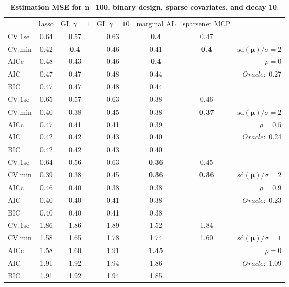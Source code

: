 \begin{table}\vspace{-.5cm}
\caption[l]{ { \bf Estimation MSE for n=100, binary design, 
sparse covariates, and  decay  10}.}
\vspace{-.5cm}
\footnotesize{}
\begin{center}
\begin{tabular}{l*{5}{c}|r}
& lasso & GL $\gamma=1$ & GL $\gamma=10$ & marginal AL & sparsenet MCP  & \\
 \cline{1-7}
CV.1se & 0.64 & 0.57 & 0.63 & {\bf 0.4} & 0.47 & \\
CV.min & 0.42 & {\bf 0.4} & 0.46 & 0.41 & {\bf 0.4} &  $\mathrm{sd}(\mathbf{\mu})/\sigma=2$ \\
AICc & 0.48 & 0.43 & 0.46 & {\bf 0.4} & & $\rho=0$ \\
AIC & 0.47 & 0.47 & 0.48 & 0.44 & &  \multirow{2}{*}{$Oracle: $ 0.27} \\
BIC & 0.47 & 0.47 & 0.48 & 0.44 & &  \\
 \hline 
CV.1se & 0.65 & 0.57 & 0.63 & 0.38 & 0.46 & \\
CV.min & 0.40 & 0.38 & 0.45 & 0.38 & {\bf 0.37} &  $\mathrm{sd}(\mathbf{\mu})/\sigma=2$ \\
AICc & 0.47 & 0.41 & 0.41 & 0.39 & & $\rho=0.5$ \\
AIC & 0.42 & 0.42 & 0.43 & 0.40 & &  \multirow{2}{*}{$Oracle: $ 0.24} \\
BIC & 0.42 & 0.42 & 0.43 & 0.40 & &  \\
 \hline 
CV.1se & 0.64 & 0.56 & 0.63 & {\bf 0.36} & 0.45 & \\
CV.min & 0.39 & 0.38 & 0.45 & {\bf 0.36} & {\bf 0.36} &  $\mathrm{sd}(\mathbf{\mu})/\sigma=2$ \\
AICc & 0.46 & 0.40 & 0.38 & 0.38 & & $\rho=0.9$ \\
AIC & 0.40 & 0.40 & 0.41 & 0.38 & &  \multirow{2}{*}{$Oracle: $ 0.23} \\
BIC & 0.40 & 0.40 & 0.41 & 0.38 & &  \\
 \hline 
CV.1se & 1.86 & 1.86 & 1.89 & 1.52 & 1.84 & \\
CV.min & 1.58 & 1.65 & 1.78 & 1.74 & 1.60 &  $\mathrm{sd}(\mathbf{\mu})/\sigma=1$ \\
AICc & 1.58 & 1.60 & 1.91 & {\bf 1.45} & & $\rho=0$ \\
AIC & 1.91 & 1.92 & 1.94 & 1.86 & &  \multirow{2}{*}{$Oracle: $ 1.09} \\
BIC & 1.91 & 1.92 & 1.94 & 1.85 & &  \\
 \hline 

\end{tabular}
\end{center}
\end{table}
